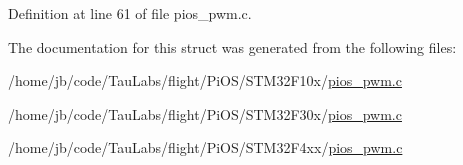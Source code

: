 \-Definition at line 61 of file pios\-\_\-pwm.\-c.



\-The documentation for this struct was generated from the following files\-:\begin{DoxyCompactItemize}
\item 
/home/jb/code/\-Tau\-Labs/flight/\-Pi\-O\-S/\-S\-T\-M32\-F10x/\hyperlink{_s_t_m32_f10x_2pios__pwm_8c}{pios\-\_\-pwm.\-c}\item 
/home/jb/code/\-Tau\-Labs/flight/\-Pi\-O\-S/\-S\-T\-M32\-F30x/\hyperlink{_s_t_m32_f30x_2pios__pwm_8c}{pios\-\_\-pwm.\-c}\item 
/home/jb/code/\-Tau\-Labs/flight/\-Pi\-O\-S/\-S\-T\-M32\-F4xx/\hyperlink{_s_t_m32_f4xx_2pios__pwm_8c}{pios\-\_\-pwm.\-c}\end{DoxyCompactItemize}
